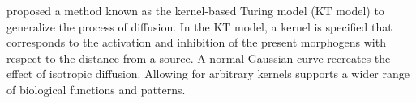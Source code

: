 \citet{kondo2017} proposed a method known as the kernel-based Turing model (KT model) to generalize the process of diffusion. In the KT model, a kernel is specified that corresponds to the activation and inhibition of the present morphogens with respect to the distance from a source. A normal Gaussian curve recreates the effect of isotropic diffusion. Allowing for arbitrary kernels supports a wider range of biological functions and patterns.